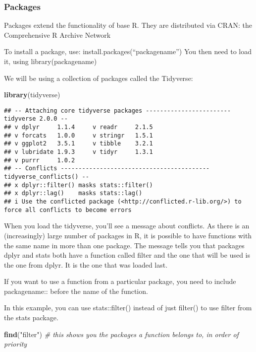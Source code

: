 \documentclass[
]{article}
\newenvironment{Shaded}{\begin{snugshade}}{\end{snugshade}}
\newcommand{\CommentTok}[1]{\textcolor[rgb]{0.56,0.35,0.01}{\textit{#1}}}
\newcommand{\FunctionTok}[1]{\textcolor[rgb]{0.13,0.29,0.53}{\textbf{#1}}}
\newcommand{\NormalTok}[1]{#1}
\newcommand{\StringTok}[1]{\textcolor[rgb]{0.31,0.60,0.02}{#1}}
\begin{document}
\subsubsection{Packages}\label{packages}

Packages extend the functionality of base R. They are distributed via
CRAN: the Comprehensive R Archive Network

To install a package, use: install.packages(``packagename'') You then
need to load it, using library(packagename)

We will be using a collection of packages called the Tidyverse:

\begin{Shaded}
\begin{Highlighting}[]
\FunctionTok{library}\NormalTok{(tidyverse)}
\end{Highlighting}
\end{Shaded}

\begin{verbatim}
## -- Attaching core tidyverse packages ------------------------ tidyverse 2.0.0 --
## v dplyr     1.1.4     v readr     2.1.5
## v forcats   1.0.0     v stringr   1.5.1
## v ggplot2   3.5.1     v tibble    3.2.1
## v lubridate 1.9.3     v tidyr     1.3.1
## v purrr     1.0.2     
## -- Conflicts ------------------------------------------ tidyverse_conflicts() --
## x dplyr::filter() masks stats::filter()
## x dplyr::lag()    masks stats::lag()
## i Use the conflicted package (<http://conflicted.r-lib.org/>) to force all conflicts to become errors
\end{verbatim}

When you load the tidyverse, you'll see a message about conflicts. As
there is an (increasingly) large number of packages in R, it is possible
to have functions with the same name in more than one package. The
message tells you that packages dplyr and stats both have a function
called filter and the one that will be used is the one from dplyr. It is
the one that was loaded last.

If you want to use a function from a particular package, you need to
include packagename:: before the name of the function.

In this example, you can use stats::filter() instead of just filter() to
use filter from the stats package.

\begin{Shaded}
\begin{Highlighting}[]
\FunctionTok{find}\NormalTok{(}\StringTok{"filter"}\NormalTok{) }\CommentTok{\# this shows you the packages a function belongs to, in order of priority}
\end{Highlighting}
\end{Shaded}
\end{document}
